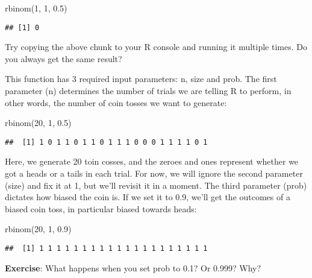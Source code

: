 \documentclass[
]{book}
\newenvironment{Shaded}{\begin{snugshade}}{\end{snugshade}}
\newcommand{\DecValTok}[1]{\textcolor[rgb]{0.00,0.00,0.81}{#1}}
\newcommand{\FloatTok}[1]{\textcolor[rgb]{0.00,0.00,0.81}{#1}}
\newcommand{\FunctionTok}[1]{\textcolor[rgb]{0.00,0.00,0.00}{#1}}
\newcommand{\NormalTok}[1]{#1}
\begin{document}
\begin{Shaded}
\begin{Highlighting}[]
\FunctionTok{rbinom}\NormalTok{(}\DecValTok{1}\NormalTok{, }\DecValTok{1}\NormalTok{, }\FloatTok{0.5}\NormalTok{)}
\end{Highlighting}
\end{Shaded}

\begin{verbatim}
## [1] 0
\end{verbatim}

Try copying the above chunk to your R console and running it multiple times. Do you always get the same result?

This function has 3 required input parameters: n, size and prob. The first parameter (n) determines the number of trials we are telling R to perform, in other words, the number of coin tosses we want to generate:

\begin{Shaded}
\begin{Highlighting}[]
\FunctionTok{rbinom}\NormalTok{(}\DecValTok{20}\NormalTok{, }\DecValTok{1}\NormalTok{, }\FloatTok{0.5}\NormalTok{)}
\end{Highlighting}
\end{Shaded}

\begin{verbatim}
##  [1] 1 0 1 1 0 1 1 0 1 1 1 0 0 0 1 1 1 1 0 1
\end{verbatim}

Here, we generate 20 toin cosses, and the zeroes and ones represent whether we got a heads or a tails in each trial. For now, we will ignore the second parameter (size) and fix it at 1, but we'll revisit it in a moment. The third parameter (prob) dictates how biased the coin is. If we set it to 0.9, we'll get the outcomes of a biased coin toss, in particular biased towards heads:

\begin{Shaded}
\begin{Highlighting}[]
\FunctionTok{rbinom}\NormalTok{(}\DecValTok{20}\NormalTok{, }\DecValTok{1}\NormalTok{, }\FloatTok{0.9}\NormalTok{)}
\end{Highlighting}
\end{Shaded}

\begin{verbatim}
##  [1] 1 1 1 1 1 1 1 1 1 1 1 1 1 1 1 1 1 1 1 1
\end{verbatim}

\textbf{Exercise}: What happens when you set prob to 0.1? Or 0.999? Why?
\end{document}
